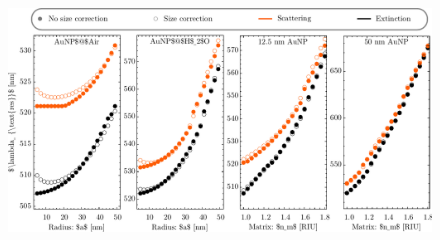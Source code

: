 \begin{figure}
\includegraphics[width=\textwidth]{1-Theory-Figs/redShift_proof.pdf}
\vspace*{-23.75em}
\hspace*{-4.5em}
\begin{subfigure}{.24\textwidth}\caption{ }\label{1}\end{subfigure}
\begin{subfigure}{.24\textwidth}\caption{ }\label{2}\end{subfigure}
\begin{subfigure}{.235\textwidth}\caption{ }\label{3}\end{subfigure}
\begin{subfigure}{.24\textwidth}\caption{ }\label{4}\end{subfigure}
\vspace*{22em}
\caption{   }
\end{figure}


%


